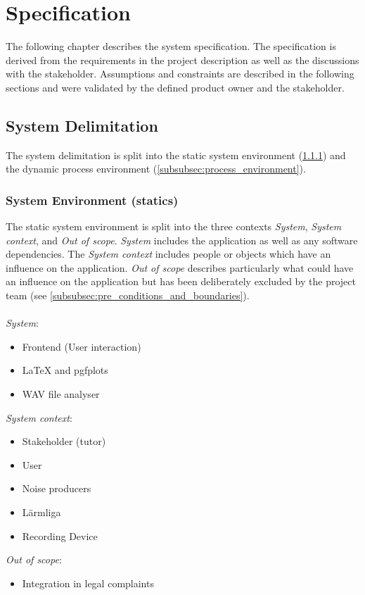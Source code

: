 \section{Specification}
The following chapter describes the system specification. The specification is derived from the requirements in the project description
as well as the discussions with the stakeholder. Assumptions and constraints are described in the following sections and were validated by
the defined product owner and the stakeholder.

\subsection{System Delimitation}
The system delimitation is split into the static system environment (\ref{subsubsec:system_environment})
and the dynamic process environment (\ref{subsubsec:process_environment}).

\subsubsection{System Environment (statics)}
\label{subsubsec:system_environment}
The static system environment is split into the three contexts \textit{System}, \textit{System context}, and \textit{Out of scope}. \textit{System} includes the application
as well as any software dependencies. The \textit{System context} includes people or objects which have an influence on the application. \textit{Out of scope} describes particularly
what could have an influence on the application but has been deliberately excluded by the project team (see \ref{subsubsec:pre_conditions_and_boundaries}). \\ \\
\textit{System}:
\begin{itemize}
    \item Frontend (User interaction)
    \item LaTeX and pgfplots
    \item WAV file analyser
\end{itemize}
\textit{System context}:
\begin{itemize}
    \item Stakeholder (tutor)
    \item User
    \item Noise producers
    \item Lärmliga
    \item Recording Device
\end{itemize}
\textit{Out of scope}:
\begin{itemize}
    \item Integration in legal complaints
\end{itemize}

